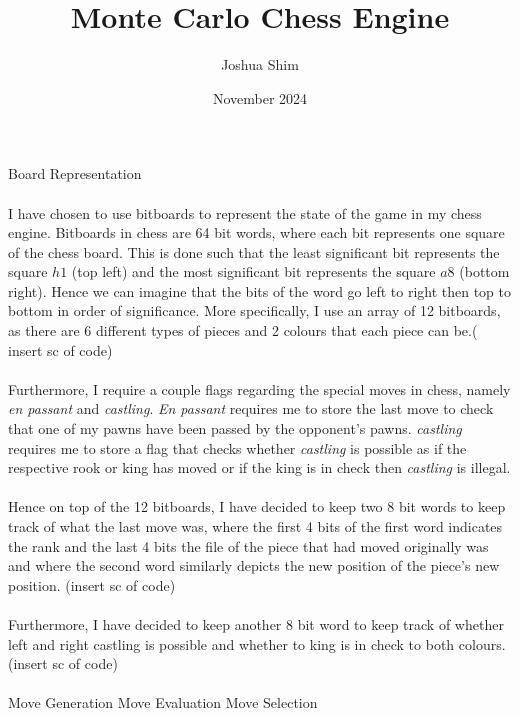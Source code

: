 \documentclass[12pt, letterpaper]{article}
\title{Monte Carlo Chess Engine}
\author{Joshua Shim}
\date{November 2024}
\begin{document}
\maketitle
\newpage
\LARGE{Board Representation}\\\\ \small
I have chosen to use bitboards to represent the state of the game in my chess engine. Bitboards in chess are 64 bit words, where each bit represents one square of the chess board. This is done such that the least significant bit represents the square $h1$ (top left) and the most significant bit represents the square $a8$ (bottom right). Hence we can imagine that the bits of the word go left to right then top to bottom in order of significance.
More specifically, I use an array of 12 bitboards, as there are 6 different types of pieces and 2 colours that each piece can be.( insert sc of code)\\\\ Furthermore, I require a couple flags regarding the special moves in chess, namely \textit{en passant} and \textit{castling}. \textit{En passant} requires me to store the last move to check that one of my pawns have been passed by the opponent's pawns. \textit{castling} requires me to store a flag that checks whether \textit{castling} is possible as if the respective rook or king has moved or if the king is in check then \textit{castling} is illegal.\\\\
Hence on top of the 12 bitboards, I have decided to keep two 8 bit words to keep track of what the last move was, where the first 4 bits of the first word indicates the rank and the last 4 bits the file of the piece that had moved originally was and where the second word similarly depicts the new position of the piece's new position. (insert sc of code)\\\\ Furthermore, I have decided to keep another 8 bit word to keep track of whether left and right castling is possible and whether to king is in check to both colours. (insert sc of code)\\\\
\newpage
\LARGE{Move Generation}
\newpage
\LARGE{Move Evaluation}
\newpage
\LARGE{Move Selection}
\end{document}

